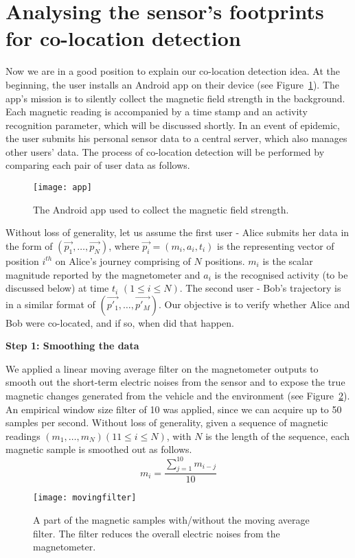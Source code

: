 \documentclass[conference]{IEEEtran}
\begin{document}
\section{Analysing the sensor's footprints for co-location detection}
Now we are in a good position to explain our co-location detection idea. At the beginning, the user installs an Android app on their device (see Figure~\ref{app}). The app's mission is to silently collect the magnetic field strength in the background. Each magnetic reading is accompanied by a time stamp and an activity recognition parameter, which will be discussed shortly. In an event of epidemic, the user submits his personal sensor data to a central server, which also manages other users' data. The process of co-location detection will be performed by comparing each pair of user data as follows. 
\begin{figure}[!t]
\centering
\texttt{[image: app]}
\caption{The Android app used to collect the magnetic field strength.}
\label{app}
\end{figure}

Without loss of generality, let us assume the first user - Alice submits her data in the form of $(\vec{p_1}, \dots, \vec{p_N})$, where $\vec{p_i}=(m_i, a_i, t_i)$ is the representing vector of position $i^{th}$ on Alice's journey comprising of $N$ positions. $m_i$ is the scalar magnitude reported by the magnetometer and $a_i$ is the recognised activity (to be discussed below) at time $t_i$ $(1 \leq i \leq N)$. The second user - Bob's trajectory is in a similar format of $(\vec{p'_1}, \dots, \vec{p'_M})$. Our objective is to verify whether Alice and Bob were co-located, and if so, when did that happen.

\textbf{Step 1: Smoothing the data}

We applied a linear moving average filter on the magnetometer outputs to smooth out the short-term electric noises from the sensor and to expose the true magnetic changes generated from the vehicle and the environment (see Figure~\ref{movingfilter}). An empirical window size filter of 10 was applied, since we can acquire up to 50 samples per second. Without loss of generality, given a sequence of magnetic readings $(m_1, \dots, m_N) (11 \leq i \leq N)$, with $N$ is the length of the sequence, each magnetic sample is smoothed out as follows.
\begin{equation}
m_i = \frac{\sum\limits_{j=1}^{10}{m_{i-j}}}{10}
\end{equation}

\begin{figure}[!t]
	\centering
	\texttt{[image: movingfilter]}
	\caption{A part of the magnetic samples with/without the moving average filter. The filter reduces the overall electric noises from the magnetometer.}
	\label{movingfilter}
\end{figure}
\end{document}
